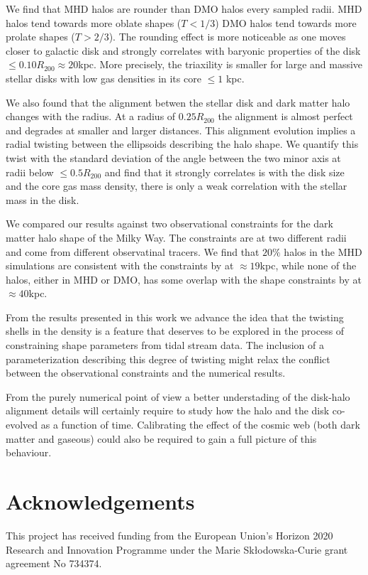 \documentclass[a4paper,fleqn,usenatbib]{mnras}
\begin{document}
We find that MHD halos are rounder than DMO halos every sampled radii. 
MHD halos tend towards more oblate shapes ($T< 1/3$) DMO halos
tend towards more prolate shapes ($T>2/3$).  
The rounding effect is more noticeable as one moves closer to galactic
disk and strongly  correlates with baryonic properties of the disk
$\leq 0.10R_{200}\approx 20$kpc. 
More precisely, the triaxility is smaller for large and massive
stellar disks with low gas densities in its core $\leq 1$ kpc. 

We also found that the alignment betwen the stellar disk and dark
matter halo changes with the radius.
At a radius of $0.25R_{200}$ the alignment is almost perfect and
degrades at smaller and larger distances.
This alignment evolution implies a radial twisting between the ellipsoids
describing the halo shape. 
We quantify this twist with the standard deviation of the angle
between the two minor axis at radii below $\leq 0.5R_{200}$ and find
that it strongly correlates is with the disk size and the core gas
mass density, there is only a weak correlation with the stellar mass
in the disk.

We compared our results against two observational constraints for the
dark matter halo shape of the Milky Way. 
The constraints are at two different radii and come from different
observatinal tracers. 
We find that $20\%$ halos in the MHD simulations are consistent with
the constraints by \cite{Bovy16} at $\approx 19$kpc, while none of the
halos, either in MHD or DMO, has some overlap with the shape
constraints by \cite{LM10} at $\approx 40$kpc. 

From the results presented in this work we advance the idea that the
twisting shells in the density is a feature that deserves to be
explored in the process of constraining shape parameters from tidal
stream data. 
The inclusion of a parameterization describing this degree of
twisting might relax the conflict between the observational
constraints and the numerical results. 

From the purely numerical point of view a better understading of the
disk-halo alignment details will certainly require to study how the
halo and the disk co-evolved as a function of time.
Calibrating the effect of the cosmic web (both dark matter and gaseous)
\citep{2014MNRAS.443.1090F,2017MNRAS.469..594B,2019MNRAS.487.1607G}
could also be required to gain a full picture of this behaviour.  


\section*{Acknowledgements}
This project has received funding from the European Union's Horizon
2020 Research and Innovation Programme under the Marie
Sk\l{}odowska-Curie grant agreement No 734374. 


 
 
\end{document}
